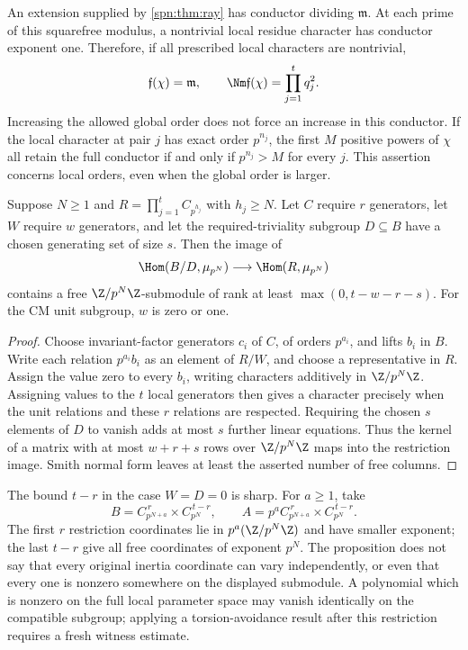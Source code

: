 An extension supplied by \cref{spn:thm:ray} has conductor dividing
$\mathfrak m$. At each prime of this squarefree modulus, a nontrivial local
residue character has conductor exponent one. Therefore, if all prescribed
local characters are nontrivial,
\begin{equation}\label{spn:eq:conductor}
 \mathfrak f(\chi)=\mathfrak m,\qquad
 \Nm\mathfrak f(\chi)=\prod_{j=1}^tq_j^2 .
\end{equation}
Increasing the allowed global order does not force an increase in this
conductor. If the local character at pair $j$ has exact order $p^{n_j}$, the
first $M$ positive powers of $\chi$ all retain the full conductor if and only
if $p^{n_j}>M$ for every $j$. This assertion concerns local orders, even when
the global order is larger.

\begin{proposition}\label{spn:prop:grid}
Suppose $N\ge1$ and $R=\prod_{j=1}^tC_{p^{h_j}}$ with $h_j\ge N$. Let $C$
require $r$ generators, let $W$ require $w$ generators, and let the
required-triviality subgroup $D\subseteq B$ have a chosen generating set of
size $s$. Then the image of
\[
 \Hom(B/D,\mu_{p^N})\longrightarrow\Hom(R,\mu_{p^N})
\]
contains a free $\Z/p^N\Z$-submodule of rank at least $\max(0,t-w-r-s)$. For
the CM unit subgroup, $w$ is zero or one.
\end{proposition}

\begin{proof}
Choose invariant-factor generators $c_i$ of $C$, of orders $p^{a_i}$, and
lifts $b_i$ in $B$. Write each relation $p^{a_i}b_i$ as an element of $R/W$,
and choose a representative in $R$. Assign the value zero to every $b_i$,
writing characters additively in $\Z/p^N\Z$. Assigning values to the $t$
local generators then gives a character precisely when the unit relations and
these $r$ relations are respected. Requiring the chosen $s$ elements of $D$
to vanish adds at most $s$ further linear equations. Thus the kernel of a
matrix with at most $w+r+s$ rows over $\Z/p^N\Z$ maps into the restriction
image. Smith normal form leaves at least the asserted number of free
columns.
\end{proof}

The bound $t-r$ in the case $W=D=0$ is sharp. For $a\ge1$, take
\[
 B=C_{p^{N+a}}^{\,r}\times C_{p^N}^{\,t-r},\qquad
 A=p^aC_{p^{N+a}}^{\,r}\times C_{p^N}^{\,t-r}.
\]
The first $r$ restriction coordinates lie in $p^a(\Z/p^N\Z)$ and have smaller
exponent; the last $t-r$ give all free coordinates of exponent $p^N$. The
proposition does not say that every original inertia coordinate can vary
independently, or even that every one is nonzero somewhere on the displayed
submodule. A polynomial which is nonzero on the full local parameter space
may vanish identically on the compatible subgroup; applying a
torsion-avoidance result after this restriction requires a fresh witness
estimate.

